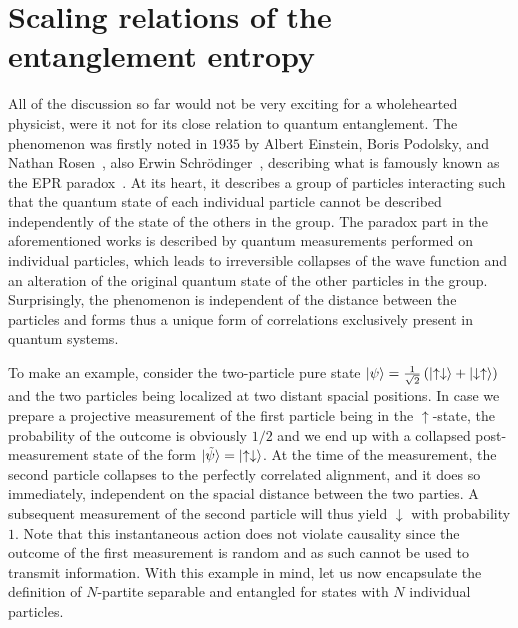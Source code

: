 \section{Scaling relations of the entanglement entropy}
\label{sec:scaling_relations_of_the_entanglement_entropy}
%
%
All of the discussion so far would not be very exciting for a wholehearted physicist, were it not for its close relation to quantum entanglement.
The phenomenon was firstly noted in $1935$ by Albert Einstein, Boris Podolsky, and Nathan Rosen~\cite{EPR1935}, also Erwin Schrödinger~\cite{Schrdinger1935,Schrdinger1936}, describing what is famously known as the EPR paradox~\cite{Reid2009}.
At its heart, it describes a group of particles interacting such that the quantum state of each individual particle cannot be described independently of the state of the others in the group.
The paradox part in the aforementioned works is described by quantum measurements performed on individual particles, which leads to irreversible collapses of the wave function and an alteration of the original quantum state of the other particles in the group.
Surprisingly, the phenomenon is independent of the distance between the particles and forms thus a unique form of correlations exclusively present in quantum systems.

To make an example, consider the two-particle pure state $\ket{\psi}=\frac1{\sqrt2}\left( \ket{\uparrow\downarrow}+\ket{\downarrow\uparrow} \right)$ and the two particles being localized at two distant spacial positions.
In case we prepare a projective measurement of the first particle being in the $\uparrow$-state, the probability of the outcome is obviously $1/2$ and we end up with a collapsed post-measurement state of the form $\ket{\tilde\psi} = \ket{\uparrow\downarrow}$.
At the time of the measurement, the second particle collapses to the perfectly correlated alignment, and it does so immediately, independent on the spacial distance between the two parties.
A subsequent measurement of the second particle will thus yield $\downarrow$ with probability $1$.
Note that this instantaneous action does not violate causality since the outcome of the first measurement is random and as such cannot be used to transmit information.
With this example in mind, let us now encapsulate the definition of $N$-partite separable and entangled for states with $N$ individual particles.

